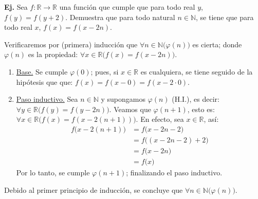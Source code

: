 \documentclass[letterpaper,DIV=14,headsepline,12pt]{scrartcl}
\makeatletter
\newcounter{Ejer}
\newcommand{\pts}{}
\newenvironment{ejercicio}[1]{\noindent
    \ifthenelse{\equal{#1}{1}}{\renewcommand{\pts}{\textbf{(#1 pt)}}}{\renewcommand{\pts}{\textbf{(#1 pts)}}}\textbf{Ej. \theEjer} \pts\stepcounter{Ejer}}{\vspace{.3cm}}
\renewenvironment{proof}[1][]{%
        \par\pushQED{\qed}%
        \normalfont\topsep6pt \partopsep0pt %
        \trivlist
        \item[\hskip\labelsep
                \textbf{\textit{Demostración.}}%
        ]#1
        }{%
        \popQED\endtrivlist\@endpefalse
    }
\makeatother
\begin{document}
    \begin{ejercicio}{2}
        Sea $f:\mathbb{R} \to \mathbb{R}$ una función que cumple que para todo real $y$, $f(y)=f(y+2)$. Demuestra que para todo natural $n \in \mathbb{N}$, se tiene que para todo real $x$, $f(x)=f(x-2n)$.
    \end{ejercicio}
    \begin{proof}
        Verificaremos por (primera) inducción que $\forall n \in \mathbb{N} \big( \varphi(n) \big)$ es cierta; donde $\varphi(n)$ es la propiedad: $\forall x \in \mathbb{R} \big( f(x) = f(x - 2n) \big)$.
        \begin{enumerate}[\hspace{1cm}]
            \item \underline{Base.} Se cumple $\varphi(0)$; pues, si $x \in \mathbb{R}$ es cualquiera, se tiene seguido de la hipótesis que que: $f(x) = f(x - 0) = f(x - 2\cdot 0)$.
            
            \item \underline{Paso inductivo.} Sea $n \in \mathbb{N}$ y supongamos $\varphi(n)$ (H.I.), es decir: $\forall y \in \mathbb{R} \big( f(y) = f(y - 2n) \big)$. Veamos que $\varphi(n+1)$, esto es: $\forall x \in \mathbb{R} \big( f(x) = f(x - 2(n+1)) \big)$. En efecto, sea $x \in \mathbb{R}$, así:
            \begin{align*}
                f\big( x - 2(n+1) \big) & = f\big( x - 2n - 2 \big) \tag*{cuentas} \\
                & = f\big( (x - 2n - 2) + 2 \big) \tag*{Hipótesis (general)} \\
                & = f\big( x -2n \big) \tag*{cuentas} \\
                & = f\big( x \big) \tag*{H.I.}
            \end{align*}
            Por lo tanto, se cumple $\varphi(n+1)$; finalizando el paso inductivo.
        \end{enumerate}
        Debido al primer principio de inducción, se concluye que $\forall n \in \mathbb{N} \big( \varphi(n) \big)$.
    \end{proof}
\end{document}
